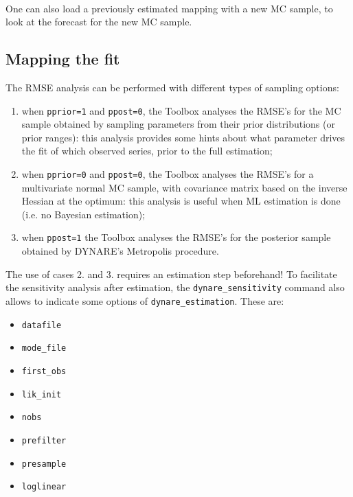 \documentclass[12pt,a4paper]{article}
\begin{document}
\vspace{0.5cm} \\

One can also load a previously estimated mapping
with a new MC sample, to look at the forecast for the new MC sample.\\

\subsection{Mapping the fit}
The RMSE analysis can be performed with different types of
sampling options:
\begin{enumerate}
\item when \verb"pprior=1" and \verb"ppost=0", the Toolbox analyses the RMSE's for
the MC sample obtained by sampling parameters from their prior
distributions (or prior ranges): this analysis provides some hints
about what parameter drives the fit of which observed series,
prior to the full estimation;
\item when \verb"pprior=0" and \verb"ppost=0", the Toolbox analyses the RMSE's for
a multivariate normal MC sample, with covariance matrix based on
the inverse Hessian at the optimum: this analysis is useful when
ML estimation is done (i.e. no Bayesian estimation);
\item when \verb"ppost=1" the Toolbox analyses
the RMSE's for the posterior sample obtained by DYNARE's
Metropolis procedure.
\end{enumerate}

The use of cases 2. and 3. requires an estimation step beforehand!
To facilitate the sensitivity analysis after estimation, the
\verb"dynare_sensitivity" command also allows to indicate some
options of \verb"dynare_estimation". These are:
\begin{itemize}
  \item \verb"datafile"
  \item \verb"mode_file"
  \item \verb"first_obs"
  \item \verb"lik_init"
  \item \verb"nobs"
  \item \verb"prefilter"
  \item \verb"presample"
  \item \verb"loglinear"
\end{itemize}


 \vspace{1cm}
\end{document}
